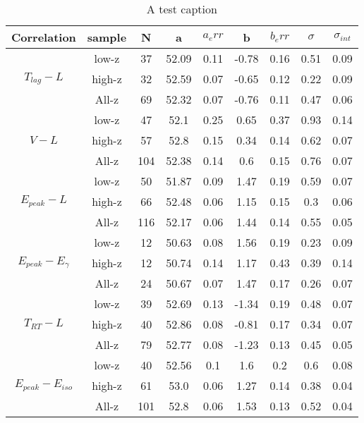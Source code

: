 \begin{table}
\centering
\begin{tabular}{|c|c|c|c|c|c|c|c|c|}
\hline
Correlation & sample & N & a & $a_err$ & b & $b_err$ & $\sigma$ & $\sigma_{int}$\\
\hline
\multirow{3}{*}{$T_{lag}-L$} & low-z & 37 & 52.09 & 0.11 & -0.78 & 0.16 & 0.51 & 0.09\\
\cline{2-9}
 & high-z & 32 & 52.59 & 0.07 & -0.65 & 0.12 & 0.22 & 0.09\\
\cline{2-9}
 & All-z & 69 & 52.32 & 0.07 & -0.76 & 0.11 & 0.47 & 0.06\\
\hline
\multirow{3}{*}{$V-L$} & low-z & 47 & 52.1 & 0.25 & 0.65 & 0.37 & 0.93 & 0.14\\
\cline{2-9}
 & high-z & 57 & 52.8 & 0.15 & 0.34 & 0.14 & 0.62 & 0.07\\
\cline{2-9}
 & All-z & 104 & 52.38 & 0.14 & 0.6 & 0.15 & 0.76 & 0.07\\
\hline
\multirow{3}{*}{$E_{peak}-L$} & low-z & 50 & 51.87 & 0.09 & 1.47 & 0.19 & 0.59 & 0.07\\
\cline{2-9}
 & high-z & 66 & 52.48 & 0.06 & 1.15 & 0.15 & 0.3 & 0.06\\
\cline{2-9}
 & All-z & 116 & 52.17 & 0.06 & 1.44 & 0.14 & 0.55 & 0.05\\
\hline
\multirow{3}{*}{$E_{peak}-E_{\gamma}$} & low-z & 12 & 50.63 & 0.08 & 1.56 & 0.19 & 0.23 & 0.09\\
\cline{2-9}
 & high-z & 12 & 50.74 & 0.14 & 1.17 & 0.43 & 0.39 & 0.14\\
\cline{2-9}
 & All-z & 24 & 50.67 & 0.07 & 1.47 & 0.17 & 0.26 & 0.07\\
\hline
\multirow{3}{*}{$T_{RT}-L$} & low-z & 39 & 52.69 & 0.13 & -1.34 & 0.19 & 0.48 & 0.07\\
\cline{2-9}
 & high-z & 40 & 52.86 & 0.08 & -0.81 & 0.17 & 0.34 & 0.07\\
\cline{2-9}
 & All-z & 79 & 52.77 & 0.08 & -1.23 & 0.13 & 0.45 & 0.05\\
\hline
\multirow{3}{*}{$E_{peak}-E_{iso}$} & low-z & 40 & 52.56 & 0.1 & 1.6 & 0.2 & 0.6 & 0.08\\
\cline{2-9}
 & high-z & 61 & 53.0 & 0.06 & 1.27 & 0.14 & 0.38 & 0.04\\
\cline{2-9}
 & All-z & 101 & 52.8 & 0.06 & 1.53 & 0.13 & 0.52 & 0.04\\
\hline
\end{tabular}
\caption{A test caption}
\label{table_pantheon_gp}
\end{table}

